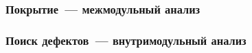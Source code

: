 \documentclass[14pt]{beamer}
\begin{document}
\begin{frame}
\frametitle{Покрытие~--- межмодульный анализ}
\begin{figure}[h]
\end{figure}
\end{frame}

\begin{frame}
\frametitle{Поиск дефектов~--- внутримодульный анализ}
\begin{figure}[h]
\end{figure}
\end{frame}
\end{document}
